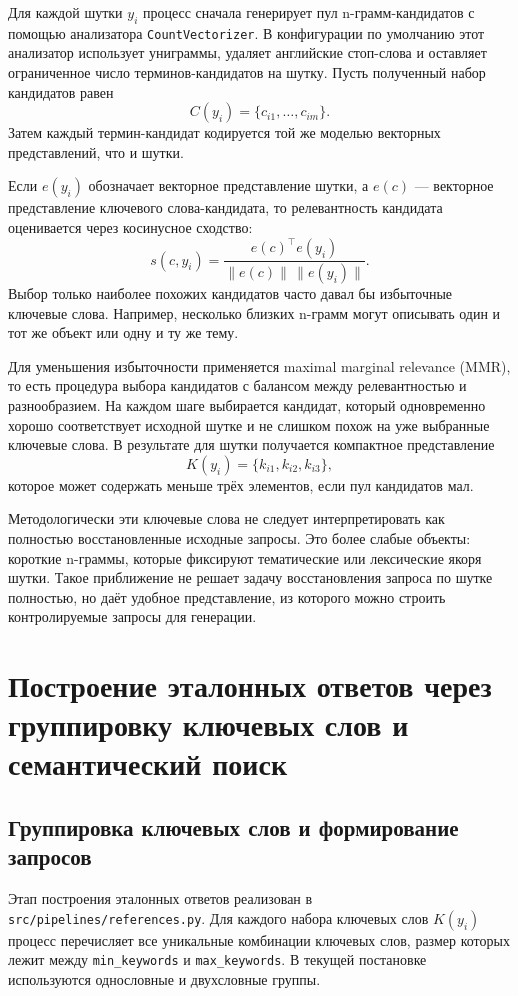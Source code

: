 Для каждой шутки \(y_i\) процесс сначала генерирует пул n-грамм-кандидатов с помощью анализатора \texttt{CountVectorizer}. В конфигурации по умолчанию этот анализатор использует униграммы, удаляет английские стоп-слова и оставляет ограниченное число терминов-кандидатов на шутку. Пусть полученный набор кандидатов равен
\[
    C(y_i)=\{c_{i1},\dots,c_{im}\}.
\]
Затем каждый термин-кандидат кодируется той же моделью векторных представлений, что и шутки.

Если \(e(y_i)\) обозначает векторное представление шутки, а \(e(c)\) --- векторное представление ключевого слова-кандидата, то релевантность кандидата оценивается через косинусное сходство:
\[
    s(c,y_i)
    =
    \frac{e(c)^\top e(y_i)}
    {\lVert e(c)\rVert\,\lVert e(y_i)\rVert}.
\]
Выбор только наиболее похожих кандидатов часто давал бы избыточные ключевые слова. Например, несколько близких n-грамм могут описывать один и тот же объект или одну и ту же тему.

Для уменьшения избыточности применяется maximal marginal relevance (MMR), то есть процедура выбора кандидатов с балансом между релевантностью и разнообразием. На каждом шаге выбирается кандидат, который одновременно хорошо соответствует исходной шутке и не слишком похож на уже выбранные ключевые слова. В результате для шутки получается компактное представление
\[
    K(y_i)=\{k_{i1},k_{i2},k_{i3}\},
\]
которое может содержать меньше трёх элементов, если пул кандидатов мал.

Методологически эти ключевые слова не следует интерпретировать как полностью восстановленные исходные запросы. Это более слабые объекты: короткие n-граммы, которые фиксируют тематические или лексические якоря шутки. Такое приближение не решает задачу восстановления запроса по шутке полностью, но даёт удобное представление, из которого можно строить контролируемые запросы для генерации.

\section{Построение эталонных ответов через группировку ключевых слов и семантический поиск}

\subsection{Группировка ключевых слов и формирование запросов}

Этап построения эталонных ответов реализован в \texttt{src/pipelines/references.py}. Для каждого набора ключевых слов \(K(y_i)\) процесс перечисляет все уникальные комбинации ключевых слов, размер которых лежит между \texttt{min\_keywords} и \texttt{max\_keywords}. В текущей постановке используются однословные и двухсловные группы.

